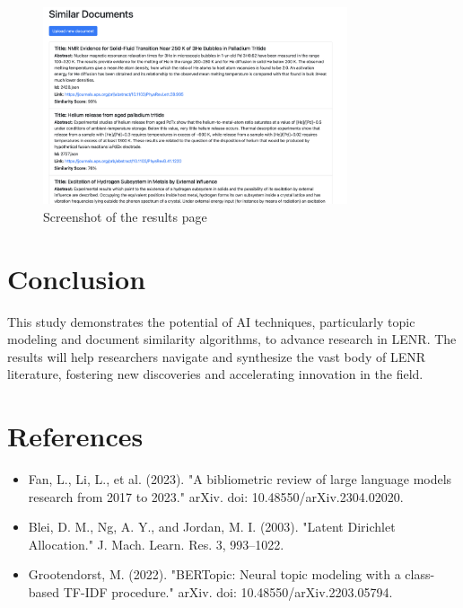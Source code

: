 \documentclass[12pt]{article}
\begin{document}
    \begin{figure}[h!]
        \centering
        \includegraphics[width=0.8\textwidth]{images/result.png}
        \caption{Screenshot of the results page}
        \label{fig:Screenshot of the results page}
    \end{figure}

\section{Conclusion}
    This study demonstrates the potential of AI techniques, particularly topic modeling and document similarity algorithms, to advance research in LENR. The results will help researchers navigate and synthesize the vast body of LENR literature, fostering new discoveries and accelerating innovation in the field.

\section{References}
\begin{itemize}
    \item Fan, L., Li, L., et al. (2023). "A bibliometric review of large language models research from 2017 to 2023." arXiv. doi: 10.48550/arXiv.2304.02020.
    \item Blei, D. M., Ng, A. Y., and Jordan, M. I. (2003). "Latent Dirichlet Allocation." J. Mach. Learn. Res. 3, 993–1022.
    \item Grootendorst, M. (2022). "BERTopic: Neural topic modeling with a class-based TF-IDF procedure." arXiv. doi: 10.48550/arXiv.2203.05794.
\end{itemize}
\end{document}
